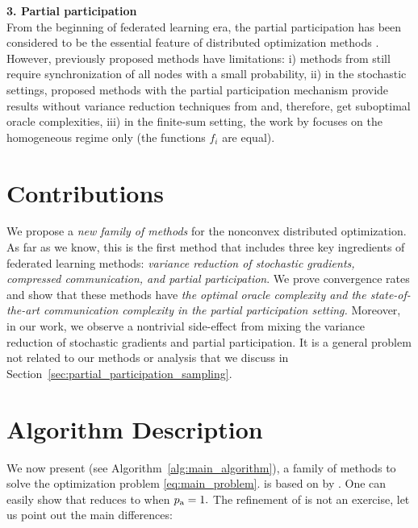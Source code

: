 \documentclass{article}
\newcommand{\algorithmname}{DASHA-PP}
\newcommand*{\probavailable}{\ensuremath{p_{\textnormal{a}}}}
\begin{document}
\textbf{3. Partial participation} \\
From the beginning of federated learning era, the partial participation has been considered to be the essential feature of distributed optimization methods \citep{mcmahan2017communication, konevcny2016federated, kairouz2021advances}. 
However, previously proposed methods have limitations: i) methods from \citep{gorbunov2021marina, zhao2021fedpage} still require synchronization of all nodes with a small probability, ii) in the stochastic settings, proposed methods with the partial participation mechanism \citep{tyurin2022dasha, zhao2021faster} provide results without variance reduction techniques from \citep{SPIDER, PAGE, cutkosky2019momentum} and, therefore, get suboptimal oracle complexities, iii) in the finite-sum setting, the work by \cite{li2021zerosarah} focuses on the homogeneous regime only (the functions $f_i$ are equal).

\section{Contributions}
We propose a \textit{new family of methods} \algname{\algorithmname} for the nonconvex distributed optimization. As far as we know, this is the first method that includes three key ingredients of federated learning methods: \textit{variance reduction of stochastic gradients, compressed communication, and partial participation}. We prove convergence rates and show that these methods have \textit{the optimal oracle complexity and the state-of-the-art communication complexity in the partial participation setting.} Moreover, in our work, we observe a nontrivial side-effect from mixing the variance reduction of stochastic gradients and partial participation. It is a general problem not related to our methods or analysis that we discuss in Section~\ref{sec:partial_participation_sampling}.

\section{Algorithm Description}

We now present \algname{\algorithmname} (see Algorithm~\ref{alg:main_algorithm}), a family of methods to solve the optimization problem \eqref{eq:main_problem}. \algname{\algorithmname} is based on  by \cite{tyurin2022dasha}. One can easily show that \algname{\algorithmname} reduces to  when $\probavailable = 1.$
The refinement of  is not an exercise, let us point out the main differences: 
\end{document}
